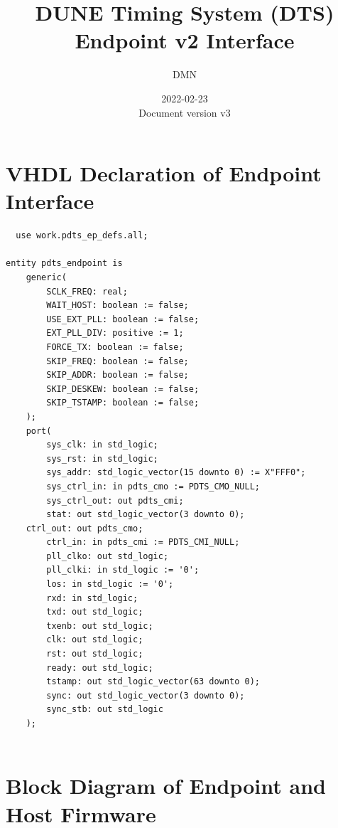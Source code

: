 \documentclass{article}
\begin{document}
\title{DUNE Timing System (DTS) Endpoint v2 Interface}

\author{DMN}
\date{2022-02-23\\\normalsize Document version v3}

\maketitle
\newpage
\section{VHDL Declaration of Endpoint Interface}
\begin{verbatim}
  use work.pdts_ep_defs.all;

entity pdts_endpoint is
    generic(
        SCLK_FREQ: real;
        WAIT_HOST: boolean := false;
        USE_EXT_PLL: boolean := false;
        EXT_PLL_DIV: positive := 1;
        FORCE_TX: boolean := false;
        SKIP_FREQ: boolean := false;
        SKIP_ADDR: boolean := false;
        SKIP_DESKEW: boolean := false;
        SKIP_TSTAMP: boolean := false;
    );
    port(
        sys_clk: in std_logic;
        sys_rst: in std_logic;
        sys_addr: std_logic_vector(15 downto 0) := X"FFF0";
        sys_ctrl_in: in pdts_cmo := PDTS_CMO_NULL;
        sys_ctrl_out: out pdts_cmi;
        stat: out std_logic_vector(3 downto 0);
    ctrl_out: out pdts_cmo;
        ctrl_in: in pdts_cmi := PDTS_CMI_NULL;
        pll_clko: out std_logic;
        pll_clki: in std_logic := '0';
        los: in std_logic := '0';
        rxd: in std_logic;
        txd: out std_logic;
        txenb: out std_logic;
        clk: out std_logic;
        rst: out std_logic;
        ready: out std_logic;
        tstamp: out std_logic_vector(63 downto 0);
        sync: out std_logic_vector(3 downto 0);
        sync_stb: out std_logic
    );


\end{verbatim}

\section{Block Diagram of Endpoint and Host Firmware}
\end{document}
